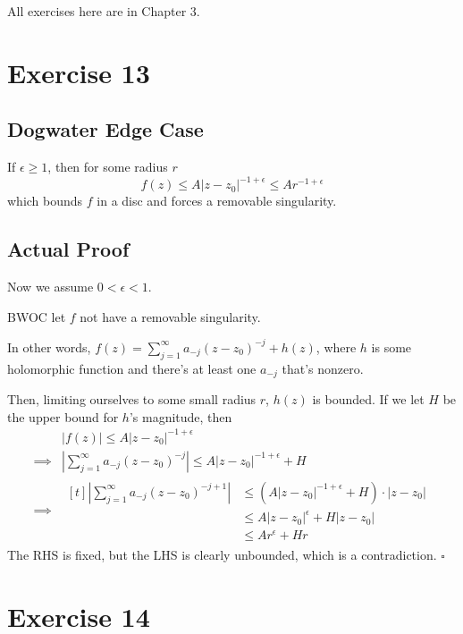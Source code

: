 \documentclass[12pt]{article}
\begin{document}
All exercises here are in Chapter 3.

\section{Exercise 13}

\subsection{Dogwater Edge Case}

If $\epsilon \ge 1$, then for some radius $r$
\[f(z) \le A|z-z_0|^{-1+\epsilon} \le Ar^{-1+\epsilon}\]
which bounds $f$ in a disc and forces a removable singularity.

\subsection{Actual Proof}

Now we assume $0 < \epsilon < 1$.

BWOC let $f$ not have a removable singularity.

In other words, $f(z)=\sum_{j=1}^{\infty} a_{-j}(z-z_0)^{-j}+h(z)$, where $h$ is some holomorphic function
and there's at least one $a_{-j}$ that's nonzero.

Then, limiting ourselves to some small radius $r$, $h(z)$ is bounded.
If we let $H$ be the upper bound for $h$'s magnitude, then
\begin{align*}
             & |f(z)| \le A|z-z_0|^{-1+\epsilon}                                                  \\
  \implies{} & \left|\sum_{j=1}^{\infty} a_{-j}(z-z_0)^{-j}\right| \le A|z-z_0|^{-1+\epsilon} + H \\
  \implies{} & \begin{aligned}[t]
                 \left|\sum_{j=1}^{\infty} a_{-j}(z-z_0)^{-j+1}\right|
                  & \le (A|z-z_0|^{-1+\epsilon} + H) \cdot |z-z_0| \\
                  & \le A|z-z_0|^\epsilon + H|z-z_0|               \\
                  & \le Ar^\epsilon + Hr
               \end{aligned}
\end{align*}
The RHS is fixed, but the LHS is clearly unbounded, which is a contradiction. $\square$

\pagebreak

\section{Exercise 14}
\end{document}
